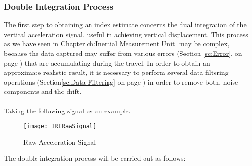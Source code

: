 \documentclass[tesi]{subfiles}
\begin{document}
\subsubsection{Double Integration Process}
\noindent The first step to obtaining an index estimate concerns the dual integration of the vertical acceleration signal, useful in achieving vertical displacement. This process as we have seen in Chapter\ref{ch:Inertial Measurement Unit} may be complex, because the data captured may suffer from various errors (Section \ref{sc:Error}, on page \pageref{sc:Error}) that are accumulating during the travel.
In order to obtain an approximate realistic result, it is necessary to perform several data filtering operations (Section\ref{sc:Data Filtering} on page \pageref{sc:Data Filtering}) in order to remove both, noise components and the drift.\\\\
\noindent Taking the following signal as an example:\\	


\begin{figure}[H]
\centering
\texttt{[image: IRIRawSignal]}
\caption{Raw Acceleration Signal}
\end{figure}

\noindent The double integration process will be carried out as follows:
\end{document}
